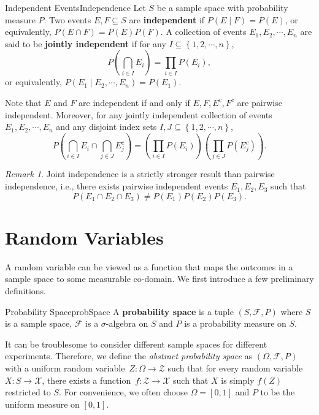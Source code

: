\documentclass[math, code]{amznotes}
\theoremstyle{remark}
\newtheorem*{remark}{Remark}
\begin{document}
\begin{dfnbox}{Independent Events}{Independence}
    Let $S$ be a sample space with probability measure $P$. Two events $E, F \subseteq S$ are {\color{red} \textbf{independent}} if $P\left(E \mid F\right) = P\left(E\right)$, or equivalently, $P\left(E \cap F\right) = P\left(E\right)P\left(F\right)$. A collection of events $E_1, E_2, \cdots, E_n$ are said to be {\color{red} \textbf{jointly independent}} if for any $I \subseteq \left\{1, 2, \cdots, n\right\}$, 
    \begin{equation*}
        P\left(\bigcap_{i \in I}E_i\right) = \prod_{i \in I}P\left(E_i\right),
    \end{equation*}
    or equivalently, $P\left(E_1 \mid E_2, \cdots, E_n\right) = P\left(E_1\right)$.
\end{dfnbox}
Note that $E$ and $F$ are independent if and only if $E, F, E^c, F^c$ are pairwise independent. Moreover, for any jointly independent collection of events $E_1, E_2, \cdots, E_n$ and any disjoint index sets $I, J \subseteq \left\{1, 2, \cdots, n\right\}$,
\begin{equation*}
    P\left(\bigcap_{i \in I}E_i \cap \bigcap_{j \in J}E_j^c\right) = \left(\prod_{i \in I}P\left(E_i\right)\right)\left(\prod_{j \in J}P\left(E_j^c\right)\right).
\end{equation*}
\begin{notebox}
    \begin{remark}
        Joint independence is a strictly stronger result than pairwise independence, i.e., there exists pairwise independent events $E_1, E_2, E_3$ such that 
        \begin{equation*}
            P\left(E_1 \cap E_2 \cap E_3\right) \neq P\left(E_1\right)P\left(E_2\right)P\left(E_3\right).
        \end{equation*}
    \end{remark}
\end{notebox}
\section{Random Variables}
A random variable can be viewed as a function that maps the outcomes in a sample space to some measurable co-domain. We first introduce a few preliminary definitions.
\begin{dfnbox}{Probability Space}{probSpace}
    A {\color{red} \textbf{probability space}} is a tuple $\left(S, \mathcal{F}, P\right)$ where $S$ is a sample space, $\mathcal{F}$ is a $\sigma$-algebra on $S$ and $P$ is a probability measure on $S$.
\end{dfnbox}
It can be troublesome to consider different sample spaces for different experiments. Therefore, we define the \textit{abstract probability space} as $\left(\Omega, \mathcal{F}, P\right)$ with a uniform random variable~$Z \colon \Omega \to \mathcal{Z}$ such that for every random variable $X \colon S \to \mathcal{X}$, there exists a function~$f \colon \mathcal{Z} \to \mathcal{X}$ such that $X$ is simply $f\left(Z\right)$ restricted to $S$. For convenience, we often choose $\Omega = \left[0, 1\right]$ and $P$ to be the uniform measure on $\left[0, 1\right]$.
\end{document}

